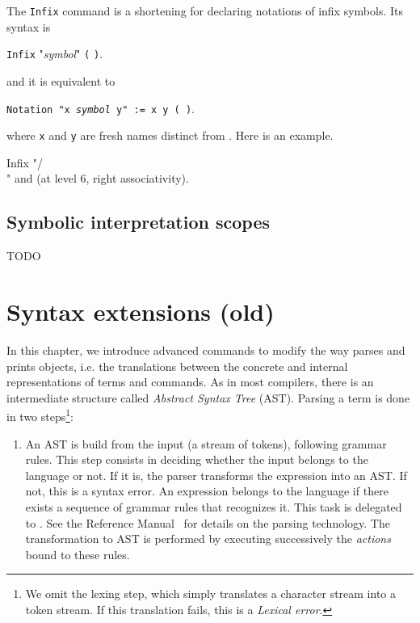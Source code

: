 {The \texttt{Infix} command is a shortening for declaring notations of
infix symbols. Its syntax is 

\medskip

\noindent\texttt{Infix} "{\em symbol}" {\qualid} {\tt (}  {\tt )}.

\medskip

and it is equivalent to

\medskip

\noindent\texttt{Notation "x {\em symbol} y" := {\qualid} x y  (  )}.

\medskip

where {\tt x} and {\tt y} are fresh names distinct from {\qualid}. Here is an example.

\begin{coq_example*}
Infix "/\\" and (at level 6, right associativity).
\end{coq_example*}

\section{Symbolic interpretation scopes}

TODO

\chapter{Syntax extensions (old)}
\label{Addoc-syntax}

In this chapter, we introduce advanced commands to modify the way
{\Coq} parses and prints objects, i.e. the translations between the
concrete and internal representations of terms and commands. As in
most compilers, there is an intermediate structure called {\em Abstract
Syntax Tree} (AST). Parsing a term is done in two steps\footnote{
  We omit the lexing step, which simply translates a character stream
  into a token stream. If this translation fails, this is a
  \emph{Lexical error}.
}:
\begin{enumerate}
\item An AST is build from the input (a stream of tokens), following
  grammar rules. This step consists in deciding whether the input
  belongs to the language or not. If it is, the parser transforms the
  expression into an AST. If not, this is a syntax error. An expression
  belongs to the language if there exists a sequence of grammar rules
  that recognizes it. This task is delegated to {\camlpppp}. See the
  Reference Manual~\cite{ddr98} for details on the parsing
  technology. The transformation to AST is performed by executing
  successively the {\sl actions} bound to these rules.
  

\end{enumerate}}
